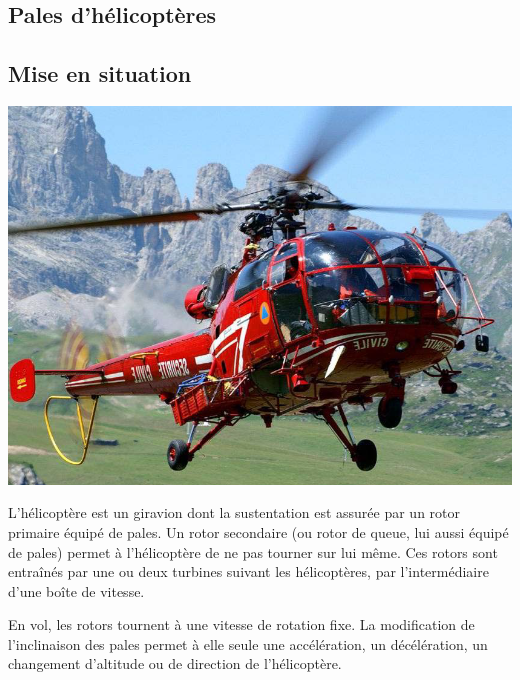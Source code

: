 \documentclass[10pt,fleqn]{article} %
\begin{document}

\vspace{4.4cm}
\pagestyle{fancy}
\thispagestyle{plain}


\def\columnseprulecolor{\color{ocre}}
\setlength{\columnseprule}{0.4pt} 

\ifprof
\begin{multicols}{2}
\else
\begin{multicols}{2}
\fi


\section*{Pales d'hélicoptères}
\subsection*{Mise en situation}
\ifprof
\else
\begin{center}
\includegraphics[width=.7\linewidth]{images/fig1}
\end{center}
L'hélicoptère est un giravion dont la sustentation est assurée par un rotor primaire équipé de pales. Un rotor secondaire (ou rotor de queue, lui aussi équipé de pales) permet à l'hélicoptère de ne pas tourner sur lui même. Ces rotors sont entraînés par une ou deux turbines suivant les hélicoptères, par l'intermédiaire d'une boîte de vitesse. 

En vol, les rotors tournent à une vitesse de rotation fixe. La modification de l'inclinaison des pales permet à elle seule une accélération, un décélération, un changement d'altitude ou de direction de l'hélicoptère.



\end{multicols}
\end{multicols}
\end{document}
